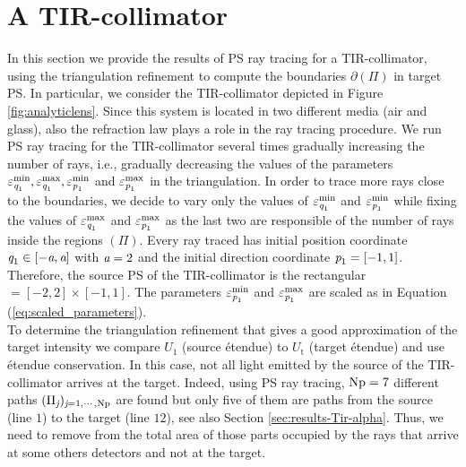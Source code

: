 \section{A TIR-collimator}
In this section we provide the results of PS ray tracing for a TIR-collimator, using the triangulation refinement to compute the boundaries $\partial$$(\Pi)$ in target PS. In particular, we consider the TIR-collimator depicted in Figure \ref{fig:analyticlens}. Since this system is located in two different media (air and glass), also the refraction law plays a role in the ray tracing procedure. We run PS ray tracing for the TIR-collimator several times gradually increasing the number of rays, i.e., gradually decreasing the values of the parameters $\varepsilon_{\textit{q}_1}^{\textrm{min}}, \varepsilon_{\textit{q}_1}^{\textrm{max}}, \varepsilon_{\textit{p}_1}^{\textrm{min}}$ and $\varepsilon_{\textit{p}_1}^{\textrm{max}}$ in the triangulation. In order to trace more rays close to the boundaries, we decide to vary only the values of $\varepsilon_{\textit{q}_1}^{\textrm{min}}$ and $ \varepsilon_{\textit{p}_1}^{\textrm{min}}$ while fixing the values of $ \varepsilon_{\textit{q}_1}^{\textrm{max}}$ and $ \varepsilon_{\textit{p}_1}^{\textrm{max}}$ as the last two are responsible of the number of rays inside the regions $(\Pi)$. Every ray traced has initial position coordinate $\textit{q}_1\in[-\textit{a}, \textit{a}]$ with $\textit{a}=2$ and the initial direction coordinate $\textit{p}_1=[-1,1]$. Therefore, the source PS of the TIR-collimator is the rectangular $= [-2, 2] \times [-1, 1]$. The parameters $\varepsilon_{\textit{p}_1}^{\textrm{min}}$ and $\varepsilon_{\textit{p}_1}^{\textrm{max}}$ are scaled as in Equation (\ref{eq:scaled_parameters}).
\\ \indent To determine the triangulation refinement that gives a good approximation of the target intensity we compare $U_1$ (source \'{e}tendue) to $U_{\textrm{t}}$ (target \'{e}tendue) and use \'{e}tendue conservation. In this case, not all light emitted by the source of the TIR-collimator arrives at the target. Indeed, using PS ray tracing, $\textrm{Np}=7$ different paths $(\Pi_{\textit{j}})_{\textit{j}=1, \cdots, \textrm{Np}}$ are found but only five of them are paths from the source (line $1$) to the target (line $12$), see also Section \ref{sec:results-Tir-alpha}. Thus, we need to remove from the total area of  those parts occupied by the rays that arrive at some others detectors and not at the target. %
